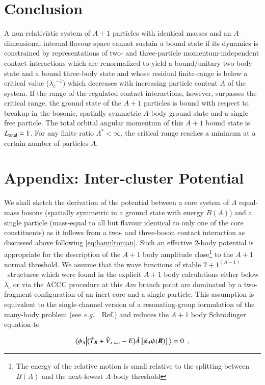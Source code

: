 \documentclass[preprint,12pt]{elsarticle}
\newcommand{\lc}{\ensuremath{\lambda_c}}
\newcommand{\abb}{\ensuremath{2\!+\!1^{(A-1)}}}
\newcommand{\eg}{\textit{e.g.}~}
\newcommand{\ve}[1]{\ensuremath{\boldsymbol{#1}}}
\newcommand{\be}{\begin{equation}}
\newcommand{\ee}{\end{equation}}
\newcommand{\bra}{\big\langle}
\newcommand{\ket}{\big\rangle}
\newcommand{\hl}{\big\vert}
\newcommand{\la}{\label}
\begin{document}
\section{Conclusion}
A non-relativistic system of $A+1$ particles with identical masses and
an $A$-dimensional internal flavour space cannot sustain a bound state if
its dynamics is constrained by representations of two- and three-particle
momentum-independent contact interactions which are renormalized to yield
a bound/unitary two-body state and a bound three-body state and whose
residual finite-range is below a critical value ($\lc^{−1}$)
which decreases with increasing particle content $A$ of the system.
If the range of the regulated contact interactions, however, surpasses the
critical range, the ground state of the $A+1$ particles is bound with respect
to breakup in the bosonic, spatially symmetric $A$-body ground state and a
single free particle. The total orbital angular momentum of this $A+1$ bound
state is $L_{\text{\scriptsize total}}= 1$.
For any finite ratio $\Lambda^*<\infty$,
the critical range reaches a minimum at a certain number of particles $A$.

\section{Appendix: Inter-cluster Potential}\la{app:rgm}
We shall sketch the derivation of the potential between a core system of $A$ equal-mass bosons (spatially symmetric
in a ground state with energy $B(A)$) and a single particle (mass-equal to all but flavour identical to only one
of the core constituents) as it follows from a two- and three-boson contact interaction as discussed above following
\eqref{eq:hamiltonian}. Such an effective 2-body potential is appropriate for the description of the $A+1$ body amplitude
close\footnote{The energy of the relative motion is small relative to the splitting between $B(A)$ and the
next-lowest $A$-body threshold} to the $A+1$ normal threshold. We assume that the wave functions of stable \abb~structures
which were found in the explicit $A+1$ body calculations either below $\lc$ or via the ACCC procedure at this
$Am$ branch point are dominated by a two-fragment configuration of an inert core and a single particle. This
assumption is equivalent to the single-channel version of a resonating-group formulation of the many-body problem
(see \eg~Ref.\cite{TANG1978167}) and reduces the $A+1$ body Schr\"odinger equation to

\be\la{eq:rgm}
\bra\phi_A\hl\big(\hat{T}_{\ve{R}}+\hat{V}_\text{\tiny A,A+1}-E\big)\hat{A}\left[\phi_A\psi(\ve{R})\right]\ket=0\;\;,
\ee 
\end{document}
